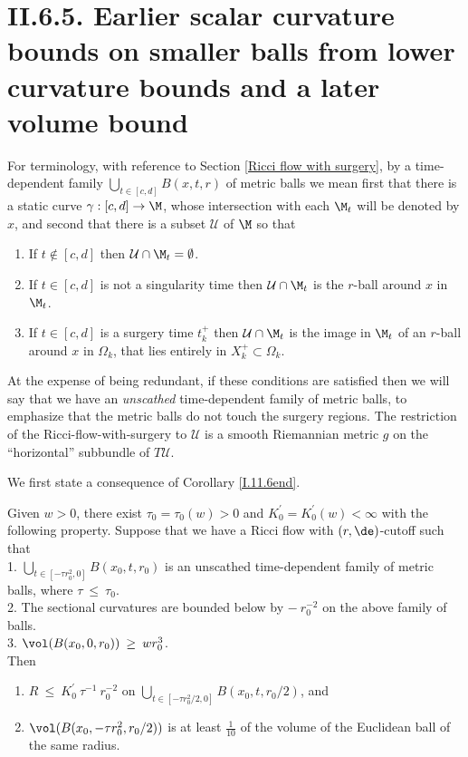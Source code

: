 \section{II.6.5. Earlier scalar curvature bounds on smaller balls from
lower curvature bounds and a later volume bound} \label{II.6.5}

For terminology, with reference to Section \ref{Ricci flow with surgery},
by a time-dependent family $\bigcup_{t \in [c,d]} B(x, t, r)$
of metric balls we mean first that there is a static
curve $\gamma : [c,d] \rightarrow \M$, whose intersection with each
$\M_t$ will be denoted by $x$, and second that there is
a subset ${\mathcal U}$ of $\M$ so that
\begin{enumerate}
\item If $t \notin [c,d]$ then ${\mathcal U} \cap \M_t = \emptyset$.
\item If $t \in [c,d]$ is not
a singularity time then ${\mathcal U} \cap \M_t$ is the $r$-ball around $x$ in
$\M_t$.
\item If $t \in [c,d]$ is a surgery time $t_k^+$ then
${\mathcal U} \cap \M_t$ is
the image in $\M_t$ of an $r$-ball around $x$ in
$\Omega_k$, that lies entirely in $X_k^+ \subset \Omega_k$.
\end{enumerate}
At the expense of being redundant, if these conditions are
satisfied then we will say that
we have an {\em unscathed} time-dependent family of metric balls,
to emphasize that the metric balls do not touch the surgery regions.
The restriction of the Ricci-flow-with-surgery to ${\mathcal U}$
is a smooth Riemannian metric $g$ on the ``horizontal'' subbundle
of $T{\mathcal U}$.

We first state a consequence of Corollary \ref{I.11.6end}.

\begin{lemma}
  \label{lem:kl-earlier-scalar-curvature-bounds-smaller-balls-from-lower-curvature-bound-estimates-scalar-curvature}
 \label{I.11.6(a)}
Given $w > 0$, there exist $\tau_0 = \tau_0(w) > 0$ and
$K_0^\prime = K_0^\prime(w) < \infty$
with the following property. Suppose that we have
a Ricci flow with $(r,\de)$-cutoff such that \\
1. $\bigcup_{t \in
[-\tau r_0^2, 0]} B(x_0, t, r_0)$ is an unscathed time-dependent family of
metric balls, where $\tau \: \le \: \tau_0$. \\
2. The sectional curvatures are bounded below by $- \: r_0^{-2}$
on the
above family of balls. \\
3. $\vol(B(x_0, 0, r_0)) \: \ge \: w r_0^3$. \\

Then
\begin{enumerate}
\item
$R \: \le \: K_0^\prime \: \tau^{-1} \: r_0^{-2}$
on $\bigcup_{ t \in [- \tau r_0^2/2, 0]} B(x_0, t, r_0/2)$, and
\item $\vol(B(x_0, -\tau r_0^2, r_0/2))$ is at least $\frac{1}{10}$
of the volume of the Euclidean ball of the same radius.
\end{enumerate}
\end{lemma}

